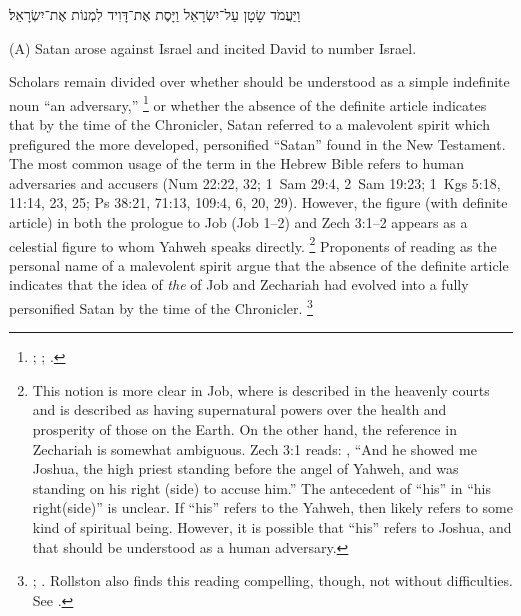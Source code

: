 \begin{hebrewtext}
    {
    וַיַּעֲמֹד שָׂטָן עַל־יִשְׂרָאֵל וַיָּסֶת אֶת־דָּוִיד לִמְנוֹת אֶת־יִשְׂרָאֵל׃
    }
\end{hebrewtext}
\begin{translation}
    (A) Satan arose against Israel and incited David to number Israel.
\end{translation}
\noindent
Scholars remain divided over whether  should be understood as a simple indefinite noun ``an adversary,''%
    \footnote{%
        \cite{stokes_jbl2009};
        \cite[114--117]{japhet2009};
        \cite[370--390]{japhet1993}.}
or whether the absence of the definite article indicates that by the time of the Chronicler, Satan referred to a malevolent spirit which prefigured the more developed, personified ``Satan'' found in the New Testament.%
    \autocite[4--5]{rollston_keith-stuckenbruck2016}
The most common usage of the term  in the Hebrew Bible refers to human adversaries and accusers (Num 22:22, 32; 1~Sam 29:4, 2~Sam 19:23; 1~Kgs 5:18, 11:14, 23, 25; Ps 38:21, 71:13, 109:4, 6, 20, 29). However, the figure  (with definite article) in both the prologue to Job (Job 1--2) and Zech 3:1--2 appears as a celestial figure to whom Yahweh speaks directly.
    \footnote{This notion is more clear in Job, where  is described in the heavenly courts and is described as having supernatural powers over the health and prosperity of those on the Earth. On the other hand, the reference in Zechariah is somewhat ambiguous. Zech 3:1 reads: , ``And he showed me Joshua, the high priest standing before the angel of Yahweh, and  was standing on his right (side) to accuse him.'' The antecedent of ``his'' in ``his right(side)'' is unclear. If ``his'' refers to the  Yahweh, then  likely refers to some kind of spiritual being. However, it is possible that ``his'' refers to Joshua, and that  should be understood as a human adversary.}
Proponents of reading  as the personal name of a malevolent spirit argue that the absence of the definite article indicates that the idea of \emph{the}  of Job and Zechariah had evolved into a fully personified Satan by the time of the Chronicler.%
    \footnote{%
        \cite[216--217]{braun1986};
        \cite[107]{coggins1976}. Rollston also finds this reading compelling, though, not without difficulties. See 
        \cite[4--5]{rollston_keith-stuckenbruck2016}.}

